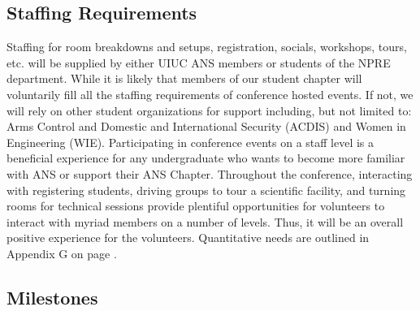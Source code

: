 \subsection{Staffing Requirements}
Staffing for room breakdowns and setups, registration, socials, workshops, tours, etc.  will be supplied by either UIUC ANS members or students of the NPRE department. While it is likely that members of our student chapter will voluntarily fill all the staffing requirements of conference hosted events. If not, we will rely on other student organizations for support including, but not limited to: Arms Control and Domestic and International Security (ACDIS) and Women in Engineering (WIE). Participating in conference events on a staff level is a beneficial experience for any undergraduate who wants to become more familiar with ANS or support their ANS Chapter. Throughout the conference, interacting with registering students, driving groups to tour a scientific facility, and turning rooms for technical sessions provide plentiful opportunities for volunteers to interact with myriad members on a number of levels. Thus, it will be an overall positive experience for the volunteers. Quantitative needs are outlined in Appendix G on page \pageref{appendix:staff}.

\newpage
\subsection{Milestones}

